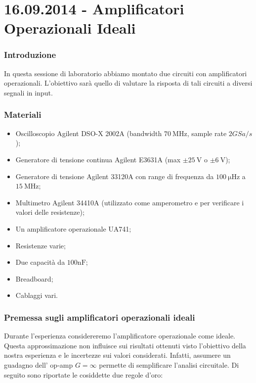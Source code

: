 \part*{16.09.2014 - Amplificatori Operazionali Ideali}

\section{Introduzione}

In questa sessione di laboratorio abbiamo montato due circuiti con amplificatori operazionali. L'obiettivo sarà quello di valutare la risposta di tali circuiti a diversi segnali in input.

\section{Materiali}

\begin{itemize} [noitemsep]
\item Oscilloscopio Agilent DSO-X 2002A (bandwidth $\SI{70}{\mega\hertz}$, sample rate $2 GSa/s$);
\item Generatore di tensione continua Agilent E3631A (max $\pm \SI{25}{\volt}$ o $\pm \SI{6}{\volt}$);
\item Generatore di tensione Agilent 33120A con range di frequenza da $\SI{100}{\micro\hertz}$ a $\SI{15}{\mega\hertz}$;
\item Multimetro Agilent 34410A (utilizzato come amperometro e per verificare i valori delle resistenze);
\item Un amplificatore operazionale UA741;
\item Resistenze varie;  
\item Due capacità da $100 \si{\nano\farad}$;
\item Breadboard;
\item Cablaggi vari.
\end{itemize}

\section{Premessa sugli amplificatori operazionali ideali}

Durante l'esperienza considereremo l'amplificatore operazionale come ideale. Questa approssimazione non influisce sui risultati ottenuti visto l'obiettivo della nostra esperienza e le incertezze sui valori considerati. Infatti, assumere un guadagno dell' op-amp $G=\infty$ permette di semplificare l'analisi circuitale. Di seguito sono riportate le cosiddette due regole d'oro:


